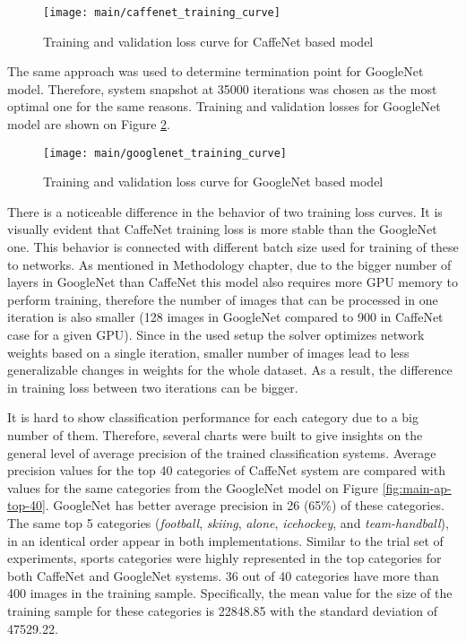     \begin{figure}[ht!]
        \centering
        \texttt{[image: main/caffenet\_training\_curve]}
        \caption[Main experiment. Training and validation loss curve for CaffeNet based model]{Training and validation loss curve for CaffeNet based model}
        \label{fig:main-caffenet-training-curve}
    \end{figure}
    
    The same approach was used to determine termination point for GoogleNet model. Therefore, system snapshot at 35000 iterations was chosen as the most optimal one for the same reasons. Training and validation losses for GoogleNet model are shown on Figure \ref{fig:main-googlenet-training-curve}.
    
    \begin{figure}[ht!]
        \centering
        \texttt{[image: main/googlenet\_training\_curve]}
        \caption[Main experiment. Training and validation loss curve for GoogleNet based model]{Training and validation loss curve for GoogleNet based model}
        \label{fig:main-googlenet-training-curve}
    \end{figure}
    
    There is a noticeable difference in the behavior of two training loss curves. It is visually evident that CaffeNet training loss is more stable than the GoogleNet one. This behavior is connected with different batch size used for training of these to networks. As mentioned in Methodology chapter, due to the bigger number of layers in GoogleNet than CaffeNet this model also requires more GPU memory to perform training, therefore the number of images that can be processed in one iteration is also smaller (128 images in GoogleNet compared to 900 in CaffeNet case for a given GPU). Since in the used setup the solver optimizes network weights based on a single iteration, smaller number of images lead to less generalizable changes in weights for the whole dataset. As a result, the difference in training loss between two iterations can be bigger.
    
    It is hard to show classification performance for each category due to a big number of them. Therefore, several charts were built to give insights on the general level of average precision of the trained classification systems. Average precision values for the top 40 categories of CaffeNet system are compared with values for the same categories from the GoogleNet model on Figure \ref{fig:main-ap-top-40}. GoogleNet has better average precision in 26 (65\%) of these categories. The same top 5 categories (\textit{football}, \textit{skiing}, \textit{alone}, \textit{icehockey}, and \textit{team-handball}), in an identical order appear in both implementations. Similar to the trial set of experiments, sports categories were highly represented in the top categories for both CaffeNet and GoogleNet systems. 36 out of 40 categories have more than 400 images in the training sample. Specifically, the mean value for the size of the training sample for these categories is 22848.85 with the standard deviation of 47529.22.
    
